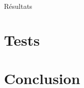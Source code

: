\documentclass{beamer}
\begin{document}
\begin{frame}{Résultats}

\end{frame}


\section{Tests}
\begin{frame}{}

\end{frame}


\section{Conclusion}
\begin{frame}{}

\end{frame}
\end{document}

